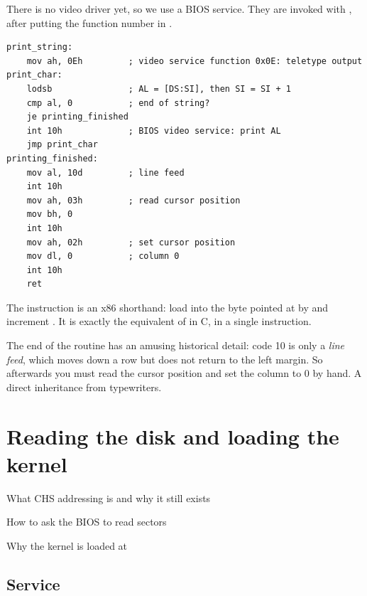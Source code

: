 There is no video driver yet, so we use a BIOS service. They are invoked with , after
putting the function number in .

\begin{lstlisting}[style=asm]
print_string:
    mov ah, 0Eh         ; video service function 0x0E: teletype output
print_char:
    lodsb               ; AL = [DS:SI], then SI = SI + 1
    cmp al, 0           ; end of string?
    je printing_finished
    int 10h             ; BIOS video service: print AL
    jmp print_char
printing_finished:
    mov al, 10d         ; line feed
    int 10h
    mov ah, 03h         ; read cursor position
    mov bh, 0
    int 10h
    mov ah, 02h         ; set cursor position
    mov dl, 0           ; column 0
    int 10h
    ret
\end{lstlisting}

The  instruction is an x86 shorthand: load into  the byte pointed at by
 and increment . It is exactly the equivalent of  in C, in a
single instruction.

The end of the routine has an amusing historical detail: code 10 is only a \emph{line feed}, which
moves down a row but does not return to the left margin. So afterwards you must read the cursor
position and set the column to 0 by hand. A direct inheritance from typewriters.


\chapter{Reading the disk and loading the kernel}

\begin{goals}
  \item What CHS addressing is and why it still exists
  \item How to ask the BIOS to read sectors
  \item Why the kernel is loaded at 
\end{goals}

\section{Service }

